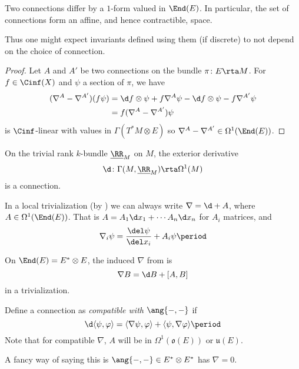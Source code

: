 \begin{prop}\label{difference of connections}
	Two connections differ by a $1$-form valued in $\End(E)$. 
	In particular, the set of connections form an affine, and hence contractible, space.
\end{prop}

\begin{remark}
	Thus one might expect invariants defined using them (if discrete) to not depend on the choice of connection.
\end{remark}

\begin{proof}
Let $A$ and $A'$ be two connections on the bundle $\pi\colon E\rta M$. 
For $f\in\Cinf(X)$ and $\psi$ a section of $\pi$, we have
	\begin{align*}
		(\nabla^A-\nabla^{A'})(f\psi)&=\d f\otimes\psi+f\nabla^A\psi-\d f\otimes\psi-f\nabla^{A'}\psi \\
		&=f(\nabla^A-\nabla^{A'})\psi
	\end{align*}
	is $\Cinf$-linear with values in $\Gamma(T^*M\otimes E)$ so $\nabla^A-\nabla^{A'}\in\Omega^1(\End(E))$.
\end{proof}

\begin{ex}
	On the trivial rank $k$-bundle $\underline{\RR}_M$ on $M$, the exterior derivative 
	\[\d\colon\Gamma(M,\underline{\RR}_M)\rta\Omega^1(M)\]
	 is a connection.
\end{ex}

\begin{ex}
	In a local trivialization (by ) we can always write $\nabla=\d+A$, where $A\in\Omega^1(\End(E))$. 
	That is $A=A_1\d x_1+\cdots A_n\d x_n$ for $A_i$ matrices, and
	\[\nabla_i\psi=\frac{\del \psi}{\del x_i}+A_i\psi \period \]
\end{ex}

\begin{ex} 
	On $\End(E)=E^*\otimes E$, the induced $\nabla$ from  is 
	\[\nabla B=\d B+[A,B]\]
	in a trivialization.
\end{ex}

Define a connection as \emph{compatible with $\ang{-,-}$} if
\[
	\d\langle\psi,\varphi\rangle=\langle \nabla\psi,\varphi\rangle+\langle\psi,\nabla\varphi\rangle \period
\]
Note that for compatible $\nabla$, $A$ will be in $\Omega^1(\mathfrak{o}(E))$ or $\mathfrak{u}(E)$. 

\begin{remark}
	A fancy way of saying this is $\ang{-,-}\in E^*\otimes E^*$ has $\nabla =0$.
\end{remark}

